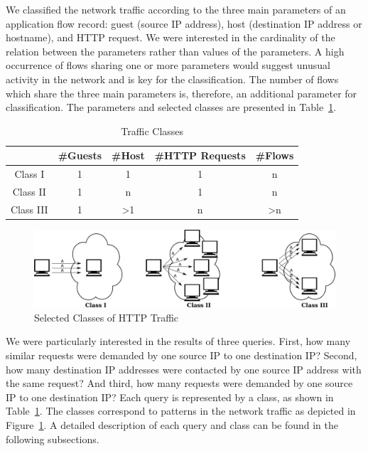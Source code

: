 We classified the network traffic according to the three main parameters of an application flow record: guest (source IP address), host (destination IP address or hostname), and HTTP request. We were interested in the cardinality of the relation between the parameters rather than values of the parameters. A high occurrence of flows sharing one or more parameters would suggest unusual activity in the network and is key for the classification. The number of flows which share the three main parameters is, therefore, an additional parameter for classification. The parameters and selected classes are presented in Table~\ref{tab:httpsecurity-classes}.

\begin{table}[ht]
\centering
\begin{tabular}{| c | c | c | c | c |} \hline
 &\#Guests & \#Host & \#HTTP Requests & \#Flows \\ \hline
Class I   & 1 &              1 & 1 & n \\ \hline
Class II  & 1 &              n & 1 & n \\ \hline
Class III & 1 & \textgreater 1 & n & \textgreater n \\ \hline
\end{tabular}
\caption{Traffic Classes}
\label{tab:httpsecurity-classes}
\end{table}

\begin{figure}
  \centering
  \includegraphics[width=\textwidth]{figures/paper-httpsecurity/classes}
  \caption{Selected Classes of HTTP Traffic}
  \label{fig:httpsecurity-classes}
\end{figure}


We were particularly interested in the results of three queries. First, how many similar requests were demanded by one source IP to one destination IP? Second, how many destination IP addresses were contacted by one source IP address with the same request? And third, how many requests were demanded by one source IP to one destination IP? Each query is represented by a class, as shown in Table~\ref{tab:httpsecurity-classes}. The classes correspond to patterns in the network traffic as depicted in Figure~\ref{fig:httpsecurity-classes}. A detailed description of each query and class can be found in the following subsections.

